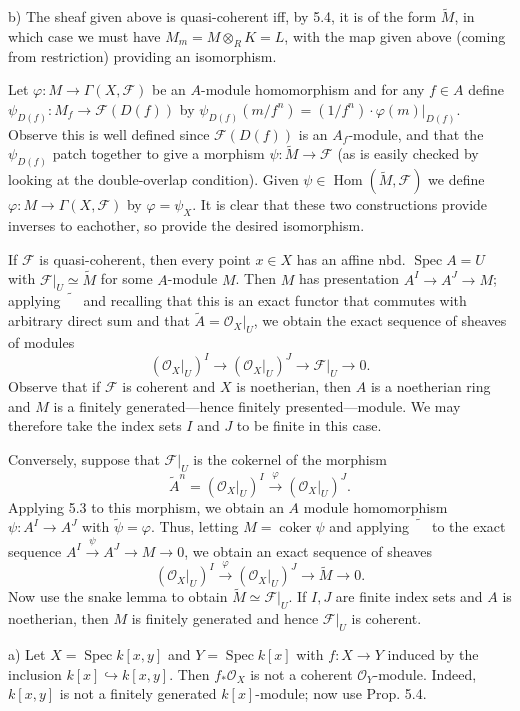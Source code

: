 \documentclass{report}
\newcommand{\F}{\mathcal{F}}
\renewcommand{\O}{\mathcal{O}}
\DeclareMathOperator{\coker}{coker}
\DeclareMathOperator{\Hom}{Hom}
\DeclareMathOperator{\Spec}{Spec}
\begin{document}
b)	The sheaf given above is quasi-coherent iff, by 5.4, it is of the form $\widetilde{M}$, in which case
we must have $M_m=M\otimes_R K=L$, with the map given above (coming from restriction) providing
an isomorphism.

\bigskip
{}	Let $\varphi:M\rightarrow \Gamma(X,\F)$ be an $A$-module homomorphism and
for any $f\in A$ define $\psi_{D(f)}:M_f\rightarrow \F(D(f))$ by $\psi_{D(f)}(m/f^n)=(1/f^n)\cdot \varphi(m)\big|_{D(f)}$.
Observe this is well defined since $\F(D(f))$ is an $A_f$-module, and that the $\psi_{D(f)}$ patch
together to give a morphism $\psi:\widetilde{M}\rightarrow \F$ (as is easily checked by looking
at the double-overlap condition).	Given $\psi\in \Hom(\widetilde{M},\F)$
we define $\varphi:M\rightarrow \Gamma(X,\F)$ by $\varphi=\psi_X$.  It is clear that these two constructions
provide inverses to eachother, so provide the desired isomorphism.


\bigskip
{}	If $\F$ is quasi-coherent, then every point $x\in X$ has an affine nbd. $\Spec A=U$ with $\F\big|_U\simeq \widetilde{M}$
for some $A$-module $M$.	Then $M$ has presentation $A^{I}\rightarrow A^{J}\rightarrow M$; applying $\widetilde{\phantom{M}}$
and recalling that this is an exact functor that commutes with arbitrary direct sum and that $\widetilde{A}=\O_X\big|_U$,
we obtain the exact sequence of sheaves of modules
$$(\O_X\big|_U)^{I}\rightarrow(\O_X\big|_U)^{J}\rightarrow \F\big|_U\rightarrow 0.$$
Observe that if $\F$ is coherent and $X$ is noetherian, then $A$ is a noetherian ring and $M$
is a finitely generated---hence finitely presented---module.  We may therefore take the index sets $I$ and $J$
to be finite in this case.

Conversely, suppose that $\F\big|_U$ is the cokernel of the morphism
$$\widetilde{A}^n=(\O_X\big|_U)^{I}\xrightarrow{\varphi}(\O_X\big|_U)^{J}.$$
Applying 5.3 to this morphism, we obtain an $A$ module homomorphism $\psi:A^{I}\rightarrow A^{J}$
with $\widetilde{\psi}=\varphi$.		Thus, letting $M=\coker\psi$ and applying $\widetilde{\phantom{M}}$
to the exact sequence
$A^{I}\xrightarrow{\psi}A^{J}\rightarrow M\rightarrow 0$, we obtain an exact sequence of sheaves
$$(\O_X\big|_U)^{I}\xrightarrow{\varphi}(\O_X\big|_U)^{J}\rightarrow \widetilde{M}\rightarrow 0.$$
Now use the snake lemma to obtain $\widetilde{M}\simeq \F\big|_U$.	
If $I,J$ are finite index sets and $A$ is noetherian, then $M$ is finitely generated and hence $\F\big|_U$
is coherent.

\bigskip
{}	a)	Let $X=\Spec k[x,y]$ and $Y=\Spec k[x]$ with $f:X\rightarrow Y$ induced by the inclusion $k[x]\hookrightarrow k[x,y]$.
Then $f_*\O_X$ is not a coherent $\O_Y$-module.  Indeed, $k[x,y]$ is not a finitely generated $k[x]$-module; now use
Prop. 5.4.
\end{document}
